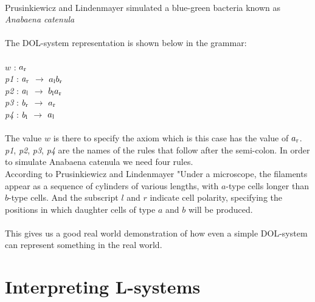 \\
Prusinkiewicz and Lindenmayer simulated a blue-green bacteria known as \textit{Anabaena catenula} \cite{prusinkiewicz2012algorithmic}\\
\\
The DOL-system representation is shown below in the grammar: \\
\\
$w$ : $ a\textsubscript{r} $\\
\textit{p1} : $ a\textsubscript{r} $ $\rightarrow$ $a\textsubscript{l}b\textsubscript{r}$ \\
\textit{p2} : $ a\textsubscript{l} $ $\rightarrow$ $b\textsubscript{l}a\textsubscript{r}$ \\
\textit{p3} : $ b\textsubscript{r} $ $\rightarrow$ $a\textsubscript{r}$ \\
\textit{p4} : $ b\textsubscript{l} $ $\rightarrow$ $a\textsubscript{l}$ \\
\\
The value $w$ is there to specify the axiom which is this case has the value of $ a\textsubscript{r} $. \textit{p1}, \textit{p2}, \textit{p3}, \textit{p4} are the names of the rules that follow after the semi-colon. In order to simulate Anabaena catenula we need four rules. \\
According to Prusinkiewicz and Lindenmayer "Under a microscope, the filaments appear as a sequence of cylinders of various lengths, with $a$-type cells longer than $b$-type cells. And the subscript $l$ and $r$ indicate cell polarity, specifying the positions in which daughter cells of type $a$ and $b$ will be produced. \cite{prusinkiewicz2012algorithmic} \\
\\ 
This gives us a good real world demonstration of how even a simple DOL-system can represent something in the real world. 


\section{Interpreting L-systems} \label{interpreting 2D l-systems}

